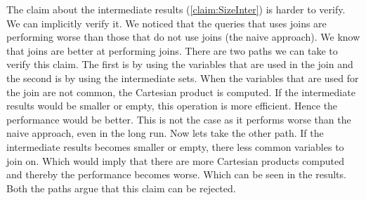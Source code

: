The claim about the intermediate results (\ref{claim:SizeInter}) is harder to verify. We can implicitly verify it. We noticed that the queries that uses joins are performing worse than those that do not use joins (the naive approach). We know that joins are better at performing joins. There are two paths we can take to verify this claim. The first is by using the variables that are used in the join and the second is by using the intermediate sets. When the variables that are used for the join are not common, the Cartesian product is computed. If the intermediate results would be smaller or empty, this operation is more efficient. Hence the performance would be better. This is not the case as it performs worse than the naive approach, even in the long run. Now lets take the other path. If the intermediate results becomes smaller or empty, there less common variables to join on. Which would imply that there are more Cartesian products computed and thereby the performance becomes worse. Which can be seen in the results. Both the paths argue that this claim can be rejected.